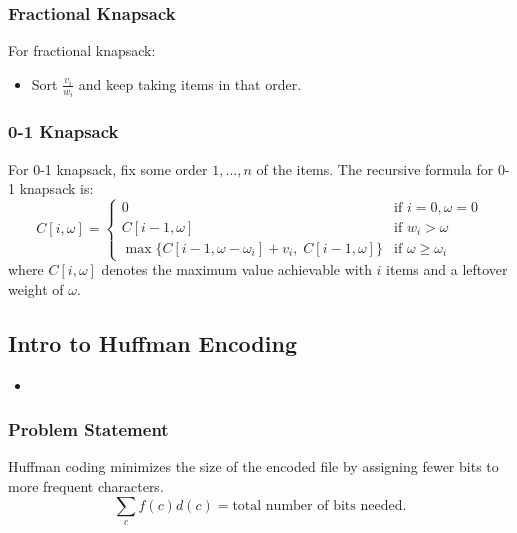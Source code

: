 \subsubsection{Fractional Knapsack}
\begin{definition}
For fractional knapsack:
\begin{itemize}
    \item Sort $\frac{v_i}{w_i}$ and keep taking items in that order.
\end{itemize}
\end{definition}

\subsubsection{0-1 Knapsack}
\begin{definition}
    For 0-1 knapsack, fix some order $1, \dots, n$ of the items. The recursive formula for 0-1 knapsack is:
    \[
    C[i, \omega] = \begin{cases} 
        0 & \text{if } i = 0, \omega = 0 \\
        C[i-1, \omega] & \text{if } w_i > \omega \\
        \max \{C[i-1, \omega - \omega_i] + v_i, \; C[i-1, \omega]\} & \text{if } \omega \geq \omega_i 
    \end{cases}
    \]
    where $C[i, \omega]$ denotes the maximum value achievable with $i$ items and a leftover weight of $\omega$.
\end{definition}

\subsection{Intro to Huffman Encoding}
\begin{intuition}
    \begin{itemize}
        \item 
    \end{itemize}
\end{intuition}

\subsubsection{Problem Statement}
\begin{intuition}
Huffman coding minimizes the size of the encoded file by assigning fewer bits to more frequent characters.
\begin{equation*}
    \sum_c f(c)d(c) = \text{total number of bits needed.}
\end{equation*}
\end{intuition}

